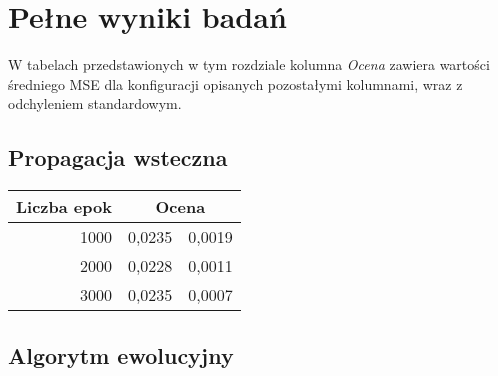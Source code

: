 \documentclass[11pt,a4paper,oneside]{report}
\begin{document}
\appendix 
\chapter{Pełne wyniki badań}

W tabelach przedstawionych w tym rozdziale kolumna \textit{Ocena} zawiera wartości średniego MSE dla konfiguracji opisanych pozostałymi kolumnami, wraz z odchyleniem standardowym.

\section{Propagacja wsteczna}

\begin{center}
	\begin{longtable}{|r|r@{$\pm$}r|}
		\hline
		\multicolumn{1}{|c|}{Liczba epok} & \multicolumn{2}{|c|}{Ocena}\\ \hline \hline\endhead
		1000 & 0,0235 & 0,0019 \\ \hline
		2000 & 0,0228 & 0,0011\\ \hline
		3000 & 0,0235 & 0,0007\\ \hline
	\end{longtable}
\end{center}

\section{Algorytm ewolucyjny}
\end{document}
